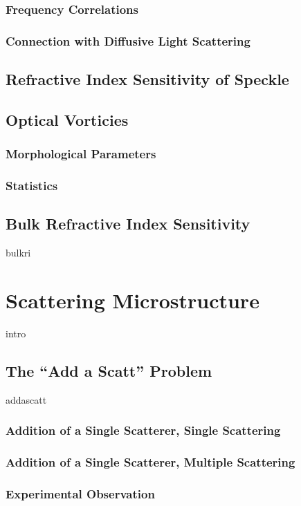 \documentclass[a4paper,titlepage,onecolumn]{report}
\begin{document}
\subsection{Frequency Correlations}
\subsection{Connection with Diffusive Light Scattering}
\section{Refractive Index Sensitivity of Speckle}
\section{Optical Vorticies}
\subsection{Morphological Parameters}
\subsection{Statistics}
\section{Bulk Refractive Index Sensitivity} \label{sec:bulkri}
{bulkri}


\chapter{Scattering Microstructure} \label{ch:scatteringmicro}
{intro}
\section{The ``Add a Scatt'' Problem}
{addascatt}
\subsection{Addition of a Single Scatterer, Single Scattering}
\subsection{Addition of a Single Scatterer, Multiple Scattering}
\subsection{Experimental Observation}
\end{document}
